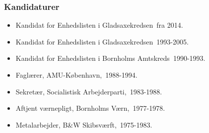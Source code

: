 \documentclass[11pt, a4paper]{awesome-cv}
\begin{document}
\begin{cvletter}
\subsubsection*{Kandidaturer}
\begin{itemize}
\item Kandidat for Enhedslisten i Gladsaxekredsen fra 2014.
\item Kandidat for Enhedslisten i Gladsaxekredsen 1993-2005.
\item Kandidat for Enhedslisten i Bornholms Amtskreds 1990-1993.
\end{itemize}
\begin{itemize}
\item Faglærer, AMU-København, 1988-1994.
\item Sekretær, Socialistisk Arbejderparti, 1983-1988.
\item Aftjent værnepligt, Bornholms Værn, 1977-1978.
\item Metalarbejder, B&W Skibsværft, 1975-1983.
\end{itemize}
\end{cvletter}
\end{document}
